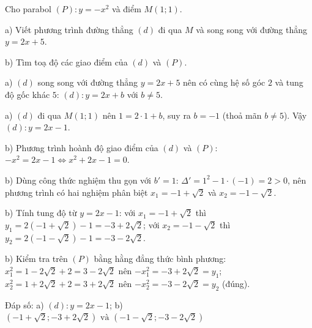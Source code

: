 \begin{problem}[9DS-HSB2-026]
Cho parabol $(P)\colon y = -x^2$ và điểm $M(1; 1)$.

a) Viết phương trình đường thẳng $(d)$ đi qua $M$ và song song với đường thẳng $y = 2x + 5$.

b) Tìm toạ độ các giao điểm của $(d)$ và $(P)$.

\begin{solution}
a) $(d)$ song song với đường thẳng $y = 2x + 5$ nên có cùng hệ số góc $2$ và tung độ gốc khác $5$: $(d)\colon y = 2x + b$ với $b \neq 5$.

a) $(d)$ đi qua $M(1; 1)$ nên $1 = 2 \cdot 1 + b$, suy ra $b = -1$ (thoả mãn $b \neq 5$). Vậy $(d)\colon y = 2x - 1$.

b) Phương trình hoành độ giao điểm của $(d)$ và $(P)$: $-x^2 = 2x - 1 \Leftrightarrow x^2 + 2x - 1 = 0$.

b) Dùng công thức nghiệm thu gọn với $b' = 1$: $\Delta' = 1^2 - 1 \cdot (-1) = 2 > 0$, nên phương trình có hai nghiệm phân biệt $x_1 = -1 + \sqrt{2}$ và $x_2 = -1 - \sqrt{2}$.

b) Tính tung độ từ $y = 2x - 1$: với $x_1 = -1 + \sqrt{2}$ thì $y_1 = 2\left(-1 + \sqrt{2}\right) - 1 = -3 + 2\sqrt{2}$; với $x_2 = -1 - \sqrt{2}$ thì $y_2 = 2\left(-1 - \sqrt{2}\right) - 1 = -3 - 2\sqrt{2}$.

b) Kiểm tra trên $(P)$ bằng hằng đẳng thức bình phương: $x_1^2 = 1 - 2\sqrt{2} + 2 = 3 - 2\sqrt{2}$ nên $-x_1^2 = -3 + 2\sqrt{2} = y_1$; $x_2^2 = 1 + 2\sqrt{2} + 2 = 3 + 2\sqrt{2}$ nên $-x_2^2 = -3 - 2\sqrt{2} = y_2$ (đúng).

Đáp số: a) $\boxed{(d)\colon y = 2x - 1}$; b) $\boxed{\left(-1 + \sqrt{2}; -3 + 2\sqrt{2}\right) \text{ và } \left(-1 - \sqrt{2}; -3 - 2\sqrt{2}\right)}$
\end{solution}
\end{problem}

